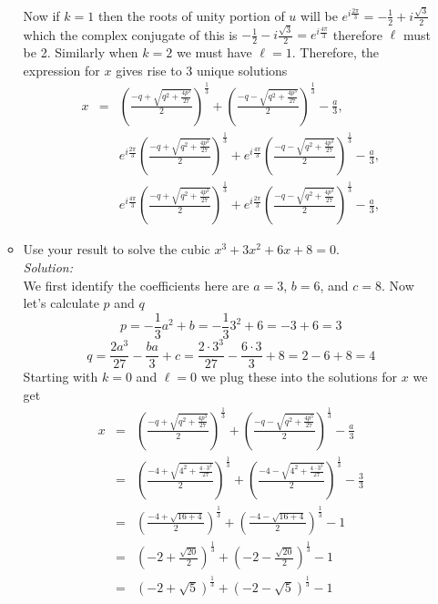 \documentclass[10pt]{amsart}
\theoremstyle{nonumberplain}
\begin{document}
\begin{enumerate}[label={\bf {\arabic*}:}]
\begin{itemize}
Now if $k=1$ then the roots of unity portion of $u$ will be $e^{i\frac{2\pi}{3}} = -\frac{1}{2} + i\frac{\sqrt{3}}{2}$ which the complex conjugate of this is $-\frac{1}{2} - i\frac{\sqrt{3}}{2} = e^{i\frac{4\pi}{3}}$ therefore $\ell$ must be 2.
Similarly when $k=2$ we must have $\ell = 1$.
Therefore, the expression for $x$ gives rise to 3 unique solutions
\begin{eqnarray*}
x &=& \left(\frac{-q + \sqrt{q^2 + \frac{4p^3}{27}}}{2}\right)^{\frac{1}{3}} + \left(\frac{-q - \sqrt{q^2 + \frac{4p^3}{27}}}{2}\right)^{\frac{1}{3}} -\frac{a}{3}, \\
&& e^{i\frac{2\pi}{3}} \left(\frac{-q + \sqrt{q^2 + \frac{4p^3}{27}}}{2}\right)^{\frac{1}{3}} + e^{i\frac{4\pi}{3}} \left(\frac{-q - \sqrt{q^2 + \frac{4p^3}{27}}}{2}\right)^{\frac{1}{3}} -\frac{a}{3}, \\
&& e^{i\frac{4\pi}{3}} \left(\frac{-q + \sqrt{q^2 + \frac{4p^3}{27}}}{2}\right)^{\frac{1}{3}} + e^{i\frac{2\pi}{3}} \left(\frac{-q - \sqrt{q^2 + \frac{4p^3}{27}}}{2}\right)^{\frac{1}{3}} -\frac{a}{3},
\end{eqnarray*}

\item Use your result to solve the cubic $x^3+3 x^2+6 x+8=0$. \\
\textit{Solution:} \\
We first identify the coefficients here are $a=3$, $b=6$, and $c=8$.
Now let's calculate $p$ and $q$
$$p = -\frac{1}{3}a^2 + b = -\frac{1}{3}3^2 + 6 = - 3 + 6 = 3$$
$$q = \frac{2a^3}{27} - \frac{ba}{3} + c  = \frac{2 \cdot 3^3}{27} - \frac{6 \cdot 3}{3} + 8 = 2 - 6 + 8 = 4$$
Starting with $k = 0$ and $\ell = 0$ we plug these into the solutions for $x$ we get
\begin{eqnarray*}
x &=& \left(\frac{-q + \sqrt{q^2 + \frac{4p^3}{27}}}{2}\right)^{\frac{1}{3}} + \left(\frac{-q - \sqrt{q^2 + \frac{4p^3}{27}}}{2}\right)^{\frac{1}{3}} -\frac{a}{3} \\
   &=& \left(\frac{-4 + \sqrt{4^2 + \frac{4 \cdot 3^3}{27}}}{2}\right)^{\frac{1}{3}} + \left(\frac{-4 - \sqrt{4^2 + \frac{4 \cdot 3^3}{27}}}{2}\right)^{\frac{1}{3}} -\frac{3}{3} \\
   &=& \left(\frac{-4 + \sqrt{16 + 4}}{2}\right)^{\frac{1}{3}} + \left(\frac{-4 - \sqrt{16 + 4}}{2}\right)^{\frac{1}{3}} -1 \\
   &=& \left( - 2 + \frac{\sqrt{20}}{2}\right)^{\frac{1}{3}} + \left(- 2 - \frac{\sqrt{20}}{2}\right)^{\frac{1}{3}} -1 \\
   &=& \left( - 2 + \sqrt{5}\right)^{\frac{1}{3}} + \left(- 2 - \sqrt{5}\right)^{\frac{1}{3}} -1
\end{eqnarray*}


\end{itemize}
\end{enumerate}
\end{document}

